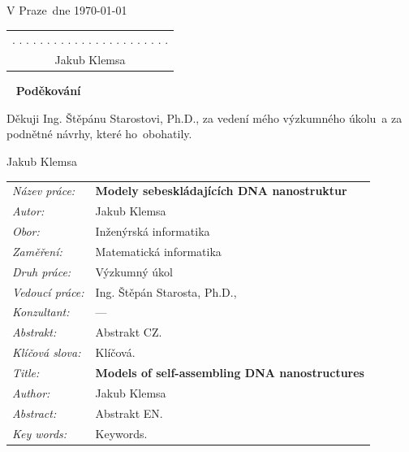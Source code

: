 \documentclass[a4paper, 11pt]{report}
\theoremstyle{definition}
\theoremstyle{remark}
\let\haluz\relax
\newcommand{\obor}{Inženýrská informatika}
\newcommand{\minf}{Matematická informatika}
\newcommand{\TypPrace}{Výzkumný úkol}
\newcommand{\mePrace}{mého výzkumného úkolu}
\newcommand{\rodPrace}{ho}
\newcommand{\nazevcz}{Modely sebeskládajících DNA nanostruktur}
\newcommand{\nazeven}{Models of self-assembling DNA nanostructures}
\newcommand{\autor}{Jakub Klemsa}
\newcommand{\vedouci}{Ing. Štěpán Starosta, Ph.D.}
\newcommand{\vedoucimu}{Ing. Štěpánu Starostovi, Ph.D.}
\newcommand{\pracovisteVed}{}
\newcommand{\konzultant}{---}
\newcommand{\vMiste}{Praze}
\newcommand{\klicova}{Klíčová.}
\newcommand{\keyword}{Keywords.}
\newcommand{\abstrCZ}{Abstrakt CZ.}
\newcommand{\abstrEN}{Abstrakt EN.}
\begin{document}
\begin{titlepage}
\noindent
\vspace{5mm}V \vMiste ~dne \today\hfill
	\begin{tabular}{c}
	. . . . . . . . . . . . . . . . . . . . . . .\\
	\autor
	\end{tabular}
\newpage


\thispagestyle{empty}
~
\vfill
\noindent\textbf{Poděkování}
\vspace{0.5cm}

\noindent
Děkuji \vedoucimu, za vedení \mePrace ~a za podnětné návrhy, které \rodPrace ~obohatily.

\begin{flushright}
\autor
\end{flushright}
\newpage


\thispagestyle{empty}

\begin{tabularx}{\textwidth}{lX}
  {\em Název práce:} & \bf \nazevcz \\[4mm]
  {\em Autor:} & \autor \\[4mm]
  {\em Obor:} & \obor \\[4mm]
  {\em Zaměření:} & \minf \\[4mm]
  {\em Druh práce:} & \TypPrace \\[4mm]
  {\em Vedoucí práce:} & \vedouci, \pracovisteVed \\[4mm]
  {\em Konzultant:} & \konzultant \\[4mm]
  {\em Abstrakt:} & \abstrCZ \\[4mm]
  {\em Klíčová slova:} & \klicova \\[20mm]

  {\em Title:} & \bf \nazeven \\[4mm]
  {\em Author:} & \autor \\[4mm]
  {\em Abstract:} & \abstrEN \\[4mm]
  {\em Key words:} & \keyword
\end{tabularx}
\newpage


\thispagestyle{empty}
\printnomenclature
\newpage


\tableofcontents
\thispagestyle{empty}

\end{titlepage}


		
		
		
		
		
		
		
		
		
\end{document}
